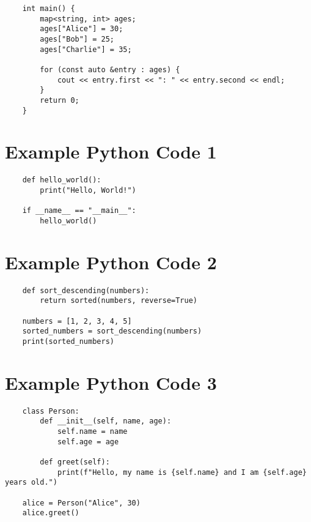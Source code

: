 \documentclass[a4paper, landscape, 9pt]{jarticle} %
\begin{document}
\begin{multicols*}{3}
\begin{lstlisting}
    int main() {
        map<string, int> ages;
        ages["Alice"] = 30;
        ages["Bob"] = 25;
        ages["Charlie"] = 35;

        for (const auto &entry : ages) {
            cout << entry.first << ": " << entry.second << endl;
        }
        return 0;
    }
    \end{lstlisting}


    \lstset{style=python}

    \section*{Example Python Code 1}
    \begin{lstlisting}
    def hello_world():
        print("Hello, World!")

    if __name__ == "__main__":
        hello_world()
    \end{lstlisting}

    \section*{Example Python Code 2}
    \begin{lstlisting}
    def sort_descending(numbers):
        return sorted(numbers, reverse=True)

    numbers = [1, 2, 3, 4, 5]
    sorted_numbers = sort_descending(numbers)
    print(sorted_numbers)
    \end{lstlisting}

    \section*{Example Python Code 3}
    \begin{lstlisting}
    class Person:
        def __init__(self, name, age):
            self.name = name
            self.age = age

        def greet(self):
            print(f"Hello, my name is {self.name} and I am {self.age} years old.")

    alice = Person("Alice", 30)
    alice.greet()
    \end{lstlisting}

\end{multicols*}
\end{document}
